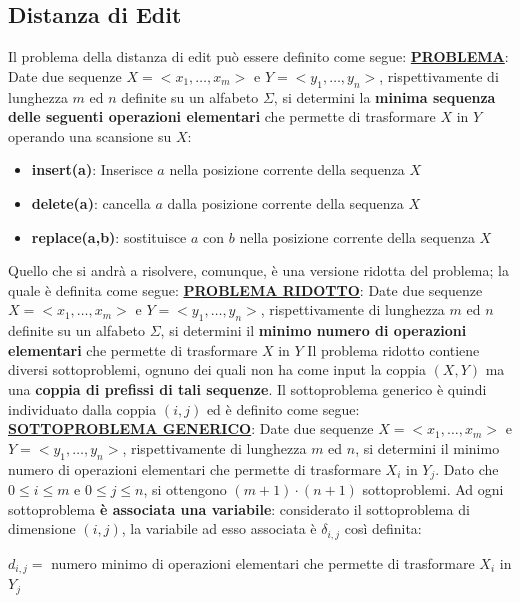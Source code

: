 \documentclass[12pt]{article}
\begin{document}
\subsection{Distanza di Edit}
Il problema della distanza di edit può essere definito come segue: \newline
\textbf{\underline{PROBLEMA}}: Date due sequenze $X = <x_1, \dots, x_m>$ e $Y = <y_1, \dots, y_n>$, rispettivamente di lunghezza $m$ ed $n$ definite su un alfabeto $\Sigma$, si determini
la \textbf{minima sequenza delle seguenti operazioni elementari} che permette di trasformare $X$ in $Y$ operando una scansione su $X$:
\begin{itemize}
    \item \textbf{insert(a)}: Inserisce $a$ nella posizione corrente della sequenza $X$
    \item \textbf{delete(a)}: cancella $a$ dalla posizione corrente della sequenza $X$
    \item \textbf{replace(a,b)}: sostituisce $a$ con $b$ nella posizione corrente della sequenza $X$
\end{itemize}
Quello che si andrà a risolvere, comunque, è una versione ridotta del problema; la quale è definita come segue: \newline
\textbf{\underline{PROBLEMA RIDOTTO}}: Date due sequenze $X = <x_1,\dots,x_m>$ e $Y = <y_1,\dots,y_n>$, rispettivamente di lunghezza $m$ ed $n$ definite su un alfabeto
$\Sigma$, si determini il \textbf{minimo numero di operazioni elementari} che permette di trasformare $X$ in $Y$ \newline
Il problema ridotto contiene diversi sottoproblemi, ognuno dei quali non ha come input la coppia $(X,Y)$ ma una \textbf{coppia di prefissi di tali sequenze}.
Il sottoproblema generico è quindi individuato dalla coppia $(i,j)$ ed è definito come segue: \newline
\textbf{\underline{SOTTOPROBLEMA GENERICO}}: Date due sequenze $X = <x_1, \dots, x_m>$ e $Y = <y_1, \dots, y_n>$, rispettivamente di lunghezza $m$ ed $n$, si determini il minimo numero di operazioni
elementari che permette di trasformare $X_i$ in $Y_j$. \newline
Dato che $0 \leq i \leq m$ e $0 \leq j \leq n$, si ottengono $(m+1) \cdot (n+1)$ sottoproblemi. Ad ogni sottoproblema \textbf{è associata una variabile}: considerato il sottoproblema di dimensione
$(i,j)$, la variabile ad esso associata è $\delta_{i,j}$ così definita:
\begin{center}
    $d_{i,j} =$ numero minimo di operazioni elementari che permette di trasformare $X_i$ in $Y_j$
\end{center}
\end{document}
